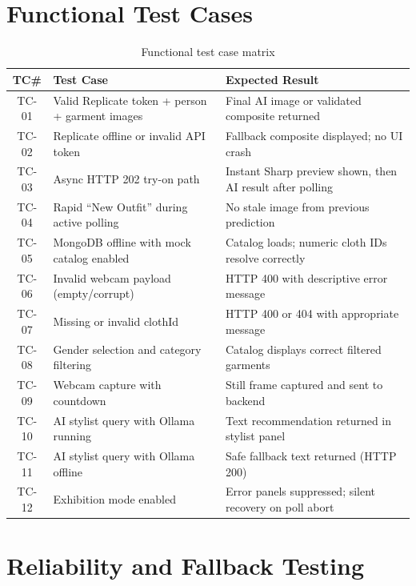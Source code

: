 \section{Functional Test Cases}
\label{sec:functional-tests}

\begin{table}[H]
  \centering
  \caption{Functional test case matrix}
  \label{tab:functional-tests}
  \small
  \begin{tabular}{@{}cp{5cm}p{5.5cm}@{}}
    \toprule
    \textbf{TC\#} & \textbf{Test Case} & \textbf{Expected Result} \\
    \midrule
    TC-01 & Valid Replicate token + person + garment images & Final AI image or validated composite returned \\
    TC-02 & Replicate offline or invalid API token & Fallback composite displayed; no UI crash \\
    TC-03 & Async HTTP 202 try-on path & Instant Sharp preview shown, then AI result after polling \\
    TC-04 & Rapid ``New Outfit'' during active polling & No stale image from previous prediction \\
    TC-05 & MongoDB offline with mock catalog enabled & Catalog loads; numeric cloth IDs resolve correctly \\
    TC-06 & Invalid webcam payload (empty/corrupt) & HTTP 400 with descriptive error message \\
    TC-07 & Missing or invalid clothId & HTTP 400 or 404 with appropriate message \\
    TC-08 & Gender selection and category filtering & Catalog displays correct filtered garments \\
    TC-09 & Webcam capture with countdown & Still frame captured and sent to backend \\
    TC-10 & AI stylist query with Ollama running & Text recommendation returned in stylist panel \\
    TC-11 & AI stylist query with Ollama offline & Safe fallback text returned (HTTP 200) \\
    TC-12 & Exhibition mode enabled & Error panels suppressed; silent recovery on poll abort \\
    \bottomrule
  \end{tabular}
\end{table}

\section{Reliability and Fallback Testing}
\label{sec:fallback-tests}

